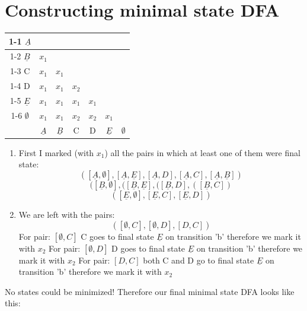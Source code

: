 \section{Constructing minimal state DFA}

\begin{tabular}{|*{7}{c|}}
                               \cline{1-1}
  $\underline{A}$                     \\ \cline{1-2}
  $\underline{B}$ & $x_1$                 \\ \cline{1-3}
  C & $x_1$ & $x_1$           \\ \cline{1-4}
  D & $x_1$ & $x_1$ & $x_2$         \\ \cline{1-5}
  $\underline{E}$ & $x_1$ & $x_1$ & $x_1$ & $x_1$    \\ \cline{1-6}
  $\emptyset$ & $x_1$ & $x_1$ & $x_2$ & $x_2$ & $x_1$ \\ \hline
    & $\underline{A}$ & $\underline{B}$ & C & D & $\underline{E}$ & $\emptyset$ \\ \hline
\end{tabular}

\begin{enumerate}
  \item First I marked (with $x_1$) all the pairs in which at least one of them were final state:
  \[ ([\underline{A}, \emptyset], [\underline{A}, \underline{E}], [\underline{A}, D], [\underline{A}, C], [\underline{A}, \underline{B}]) \]
    \[ ([\underline{B}, \emptyset], ([\underline{B}, \underline{E}], ([\underline{B}, D], ([\underline{B}, C]) \]
    \[ ([\underline{E}, \emptyset], [\underline{E}, C], [\underline{E}, D])\]

  \item We are left with the pairs:
  \[ ([\emptyset , C], [\emptyset , D], [D , C] ) \]
  For pair: $ [\emptyset , C] $ C goes to final state $\underline{E}$ on transition 'b' therefore we mark it with $x_2$
  For pair: $ [\emptyset , D] $ D goes to final state $\underline{E}$ on transition 'b' therefore we mark it with $x_2$
  For pair: $ [D , C] $ both C and D go to final state $\underline{E}$ on transition 'b' therefore we mark it with $x_2$
\end{enumerate}

No states could be minimized! Therefore our final minimal state DFA looks like this:

